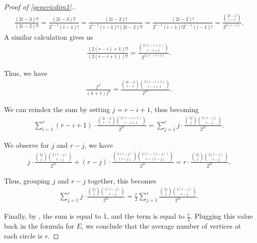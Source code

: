 \documentclass[11pt,reqno]{amsart}
\theoremstyle{definition}
\theoremstyle{problem}
\theoremstyle{plain}
\theoremstyle{remark}
\theoremstyle{theorem}
\numberwithin{equation}{section}
\numberwithin{figure}{section}
\begin{document}
\begin{proof}[Proof of \cref{genericdim1}.]
	\begin{gather*}
		\frac{(2i-3)!!}{(2i-2)!!}=\frac{(2i-3)!!}{2^{i-1}(i-1)!}
		=\frac{(2i-2)!}{2^{i-1}(i-1)!(2i-2)!!}
		=\frac{(2i-2)!}{2^{i-1}(i-1)!2^{i-1}(i-1)!}
		=\frac{\binom{2i-2}{i-1}}{2^{2(i-1)}}.
	\end{gather*}
	A similar calculation gives us 
	\begin{gather*}
		\frac{(2(r-i)+1)!!}{(2(r-i+1))!!} =
		\frac{\binom{2(r-i+1)}{r-i+1}}{2^{2(r-i+1)}}.
	\end{gather*}
	
	Thus, we have 
	\begin{gather*}
		\frac{f^{\lambda^{i}}}{(n+1)f^{\lambda}}
		=\frac{\binom{2i-2}{i-1}\binom{2(r-i+1)}{r-i+1}}{2^{2r}}.
	\end{gather*}
	
	We can reindex the sum by setting $j=r-i+1$, thus becoming
	\begin{gather*}
		\sum_{i=1}^{r}(r-i+1) \cdot
		\frac{\binom{2i-2}{i-1}\binom{2(r-i+1)}{r-i+1}}{2^{2r}} =
		\sum_{j=1}^{r}j\cdot
		\frac{\binom{2j}{j}\binom{2(r-j)}{r-j}}{2^{2r}}.
	\end{gather*}

  We observe for $j$ and $r-j$, we have
  \begin{gather*}
  j\cdot\frac{\binom{2j}{j}\binom{2(r-j)}{r-j}}{2^{2r}} + (r-j)\cdot\frac{\binom{2(r-j)}{(r-j)}\binom{2(r-(r-j))}{r-(r-j)}}{2^{2r}} = r\cdot\frac{\binom{2j}{j}\binom{2(r-j)}{r-j}}{2^{2r}}.
  \end{gather*}

  Thus, grouping $j$ and $r-j$ together, this becomes
  \begin{gather*}
  \sum_{j=1}^{r}j\cdot\frac{\binom{2j}{j}\binom{2(r-j)}{r-j}}{2^{2r}} = \frac{r}{2}\sum_{j=1}^{r}\frac{\binom{2j}{j}\binom{2(r-j)}{r-j}}{2^{2r}}.
  \end{gather*}

  Finally, by \cite{CBCC}, the sum is equal to 1, and the term is equal to $\frac{r}{2}$. Plugging this value back in the formula for $E$, we conclude that the average number of vertices at each circle is $r$. 
  \end{proof}
	
	
\end{document}
